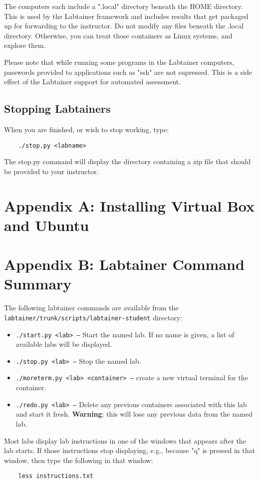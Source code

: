 \documentclass[12pt]{article}
\begin{document}
The computers each include a ".local" directory beneath the HOME directory.  This is used
by the Labtainer framework and includes results that get packaged up for forwarding to the
instructor.  Do not modify any files beneath the .local directory.  Otherwise, you can treat
those containers as Linux systems, and explore them.

Please note that while running some programs in the Labtainer computers, passwords provided to
applications such as "ssh" are not supressed.  This is a side effect of the Labtainer
support for automated assessment.  

\subsection{Stopping Labtainers}
When you are finished, or wish to stop working, type:
\begin{verbatim}
    ./stop.py <labname>
\end{verbatim}
The stop.py command will display the directory containing a zip file that should be provided to your instructor.

\appendix 
\section {Appendix A: Installing Virtual Box and Ubuntu}

\appendix 
\section {Appendix B: Labtainer Command Summary}
\label{sec:appendixB}
The following labtainer commands are available from the \texttt{labtainer/trunk/scripts/labtainer-student}
directory:
\begin{itemize}
\item \texttt{./start.py <lab> --}
Start the named lab.  If no name is given, a list of available labs will be displayed.
\item \texttt{./stop.py <lab> --} Stop the named lab.
\item \texttt{./moreterm.py <lab> <container> --} create a new virtual terminal for the container.
\item \texttt{./redo.py <lab> --}
Delete any previous containers associated with this lab and start it fresh.  \textbf{Warning}: this will lose any
previous data from the named lab.
\end{itemize}

Most labs display lab instructions in one of the windows that appears after the lab starts.  If those instructions
stop displaying, e.g., because "q" is pressed in that window, then type the following in that window:
\begin{verbatim}
    less instructions.txt
\end{verbatim}
\end{document}

